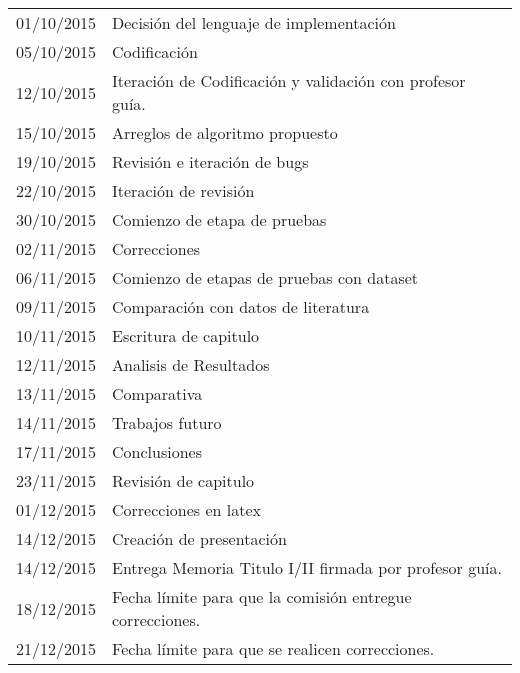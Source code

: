 \documentclass{udparticle}
\begin{document}
\begin{center}
\begin{tabular}{ll}
  01/10/2015 & Decisión del lenguaje de implementación\\
  05/10/2015 & Codificación \\
  12/10/2015 & Iteración de Codificación y validación con profesor guía.\\
  15/10/2015 & Arreglos de algoritmo propuesto\\
  19/10/2015 & Revisión e iteración de bugs \\
  22/10/2015 & Iteración de revisión \\
  30/10/2015 & Comienzo de etapa de pruebas\\
  
  02/11/2015 & Correcciones \\
  06/11/2015 & Comienzo de etapas de pruebas con dataset\\
  09/11/2015 & Comparación con datos de literatura\\
  10/11/2015 & Escritura de capitulo\\
  12/11/2015 & Analisis de Resultados\\
  13/11/2015 & Comparativa\\
  14/11/2015 & Trabajos futuro\\
  17/11/2015 & Conclusiones\\
  23/11/2015 & Revisión de capitulo\\

  01/12/2015 & Correcciones en latex\\
  14/12/2015 & Creación de presentación\\
  14/12/2015 & Entrega Memoria Titulo I/II firmada por profesor guía.\\
  18/12/2015 & Fecha límite para que la comisión entregue correcciones.\\
  21/12/2015 & Fecha límite para que se realicen correcciones.\\

  
  \hline
  \end{tabular}
  \end{center}



  
% 


 
\end{document}
